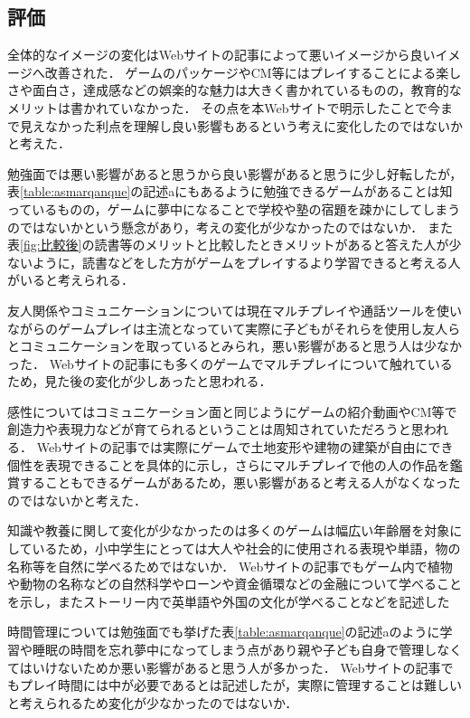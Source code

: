 \documentclass[12pt,a4j,titlepage]{ltjsarticle}
\begin{document}
\subsection{評価}
全体的なイメージの変化はWebサイトの記事によって悪いイメージから良いイメージへ改善された．
ゲームのパッケージやCM等にはプレイすることによる楽しさや面白さ，達成感などの娯楽的な魅力は大きく書かれているものの，教育的なメリットは書かれていなかった．
その点を本Webサイトで明示したことで今まで見えなかった利点を理解し良い影響もあるという考えに変化したのではないかと考えた．


勉強面では悪い影響があると思うから良い影響があると思うに少し好転したが，表\ref{table:asmarqanque}の記述aにもあるように勉強できるゲームがあることは知っているものの，ゲームに夢中になることで学校や塾の宿題を疎かにしてしまうのではないかという懸念があり，考えの変化が少なかったのではないか．
また表\ref{fig:比較後}の読書等のメリットと比較したときメリットがあると答えた人が少ないように，読書などをした方がゲームをプレイするより学習できると考える人がいると考えられる．

友人関係やコミュニケーションについては現在マルチプレイや通話ツールを使いながらのゲームプレイは主流となっていて実際に子どもがそれらを使用し友人らとコミュニケーションを取っているとみられ，悪い影響があると思う人は少なかった．
Webサイトの記事にも多くのゲームでマルチプレイについて触れているため，見た後の変化が少しあったと思われる．

感性についてはコミュニケーション面と同じようにゲームの紹介動画やCM等で創造力や表現力などが育てられるということは周知されていただろうと思われる．
Webサイトの記事では実際にゲームで土地変形や建物の建築が自由にでき個性を表現できることを具体的に示し，さらにマルチプレイで他の人の作品を鑑賞することもできるゲームがあるため，悪い影響があると考える人がなくなったのではないかと考えた．

知識や教養に関して変化が少なかったのは多くのゲームは幅広い年齢層を対象にしているため，小中学生にとっては大人や社会的に使用される表現や単語，物の名称等を自然に学べるためではないか．
Webサイトの記事でもゲーム内で植物や動物の名称などの自然科学やローンや資金循環などの金融について学べることを示し，またストーリー内で英単語や外国の文化が学べることなどを記述した

時間管理については勉強面でも挙げた表\ref{table:asmarqanque}の記述aのように学習や睡眠の時間を忘れ夢中になってしまう点があり親や子ども自身で管理しなくてはいけないためか悪い影響があると思う人が多かった．
Webサイトの記事でもプレイ時間には中が必要であるとは記述したが，実際に管理することは難しいと考えられるため変化が少なかったのではないか．
\end{document}
